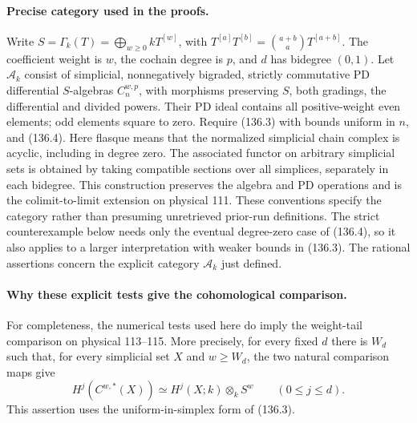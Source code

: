 \paragraph{Precise category used in the proofs.}
Write $S=\Gamma_k(T)=\bigoplus_{w\geq0}kT^{[w]}$, with
$T^{[a]}T^{[b]}=\binom{a+b}{a}T^{[a+b]}$.
The coefficient weight is $w$, the cochain degree is $p$, and
$d$ has bidegree $(0,1)$.  Let $\mathcal A_k$ consist of simplicial,
nonnegatively bigraded, strictly commutative PD differential
$S$-algebras $C_n^{w,p}$, with morphisms preserving $S$, both
gradings, the differential and divided powers.  Their PD ideal
contains all positive-weight even elements; odd elements square
to zero.  Require (136.3) with bounds uniform in $n$, and
(136.4).  Here flasque means that the normalized simplicial
chain complex is acyclic, including in degree zero.
The associated functor on arbitrary simplicial sets is obtained
by taking compatible sections over all simplices, separately in
each bidegree.  This construction preserves the algebra and PD
operations and is the colimit-to-limit extension on physical 111.
These conventions specify the category rather than presuming
unretrieved prior-run definitions.  The strict counterexample
below needs only the eventual degree-zero case of (136.4), so
it also applies to a larger interpretation with weaker bounds
in (136.3).  The rational assertions concern the explicit
category $\mathcal A_k$ just defined.

\paragraph{Why these explicit tests give the cohomological comparison.}
For completeness, the numerical tests used here do imply the
weight-tail comparison on physical 113--115.  More precisely,
for every fixed $d$ there is $W_d$ such that, for every simplicial
set $X$ and $w\geq W_d$, the two natural comparison maps give
\[
 H^j(C^{w,*}(X))\simeq H^j(X;k)\otimes_k S^w
                  \qquad(0\leq j\leq d).                  \tag{136.2}
\]
This assertion uses the uniform-in-simplex form of (136.3).

